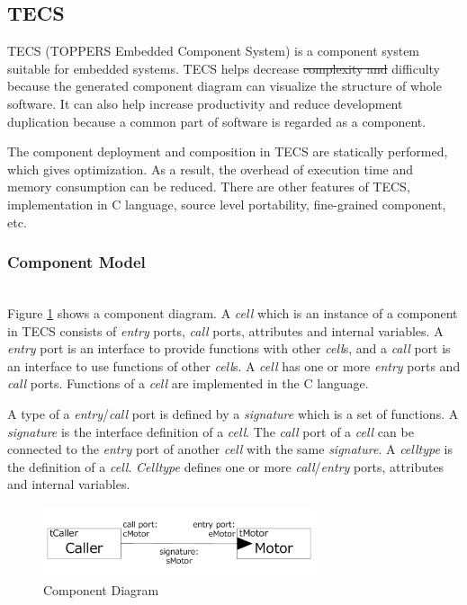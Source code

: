 \documentclass[conference,compsoc]{IEEEtran}
\providecommand{\DIFdel}[1]{{\protect\color{red}\sout{#1}}}                      %
\providecommand{\DIFdelbegin}{} %
\providecommand{\DIFdelend}{} %
\begin{document}
\subsection{TECS}
\label{sec:TECS}
TECS (TOPPERS Embedded Component System) is a component system suitable for embedded systems.
TECS helps decrease \DIFdelbegin \DIFdel{complexity and }\DIFdelend difficulty because the generated component diagram can visualize the structure of whole software.
It can also help increase productivity and reduce development duplication because a common part of software is regarded as a component.

The component deployment and composition in TECS are statically performed, which gives optimization.
As a result, the overhead of execution time and memory consumption can be reduced.
There are other features of TECS, implementation in C language, source level portability, fine-grained component, etc.

\subsubsection{Component Model}\mbox{}\\

Figure \ref{fig:component} shows a component diagram.
A {\it cell} which is an instance of a component in TECS consists of {\it entry} ports, {\it call} ports, attributes and internal variables.
A {\it entry} port is an interface to provide functions with other {\it cell}s, and a {\it call} port is an interface to use functions of other {\it cell}s.
A {\it cell} has one or more {\it entry} ports and {\it call} ports.
Functions of a {\it cell} are implemented in the C language.

A type of a {\it entry}/{\it call} port is defined by a {\it signature} which is a set of functions.
A {\it signature} is the interface definition of a {\it cell}.
The {\it call} port of a {\it cell} can be connected to the {\it entry} port of another {\it cell} with the same {\it signature}.
A {\it celltype} is the definition of a {\it cell}.
{\it Celltype} defines one or more {\it call}/{\it entry} ports, attributes and internal variables.

\begin{figure}[t]
    \centering
    \includegraphics[width=8cm,clip]{figure/component_diagram.pdf}
    \caption{Component Diagram}
    \label{fig:component}
\end{figure}
\end{document}
